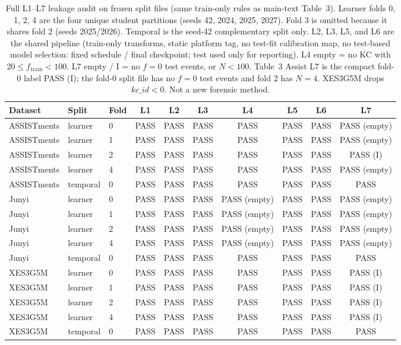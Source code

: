 \begin{table}[htbp]
\caption{Full L1--L7 leakage audit on frozen split files (same train-only rules as main-text Table~3). Learner folds 0, 1, 2, 4 are the four unique student partitions (seeds 42, 2024, 2025, 2027). Fold 3 is omitted because it shares fold 2 (seeds 2025/2026). Temporal is the seed-42 complementary split only. L2, L3, L5, and L6 are the shared pipeline (train-only transforms, static platform tag, no test-fit calibration map, no test-based model selection: fixed schedule / final checkpoint; test used only for reporting). L4 empty = no KC with $20\le f_{\mathrm{train}}<100$. L7 empty / I = no $f=0$ test events, or $N<100$. Table~3 Assist L7 is the compact fold-0 label PASS (I); the fold-0 split file has no $f=0$ test events and fold 2 has $N=4$. XES3G5M drops $kc\_id<0$. Not a new forensic method.}
\label{tab:s10_leakage}
\centering
\scriptsize
\setlength{\tabcolsep}{3.2pt}
\begin{tabular}{lllccccccc}
\toprule
Dataset & Split & Fold & L1 & L2 & L3 & L4 & L5 & L6 & L7 \\
\midrule
ASSISTments & learner & 0 & PASS & PASS & PASS & PASS & PASS & PASS & PASS (empty) \\
ASSISTments & learner & 1 & PASS & PASS & PASS & PASS & PASS & PASS & PASS (empty) \\
ASSISTments & learner & 2 & PASS & PASS & PASS & PASS & PASS & PASS & PASS (I) \\
ASSISTments & learner & 4 & PASS & PASS & PASS & PASS & PASS & PASS & PASS (empty) \\
ASSISTments & temporal & 0 & PASS & PASS & PASS & PASS & PASS & PASS & PASS \\
Junyi & learner & 0 & PASS & PASS & PASS & PASS (empty) & PASS & PASS & PASS (empty) \\
Junyi & learner & 1 & PASS & PASS & PASS & PASS (empty) & PASS & PASS & PASS (empty) \\
Junyi & learner & 2 & PASS & PASS & PASS & PASS (empty) & PASS & PASS & PASS (empty) \\
Junyi & learner & 4 & PASS & PASS & PASS & PASS (empty) & PASS & PASS & PASS (empty) \\
Junyi & temporal & 0 & PASS & PASS & PASS & PASS & PASS & PASS & PASS \\
XES3G5M & learner & 0 & PASS & PASS & PASS & PASS & PASS & PASS & PASS (I) \\
XES3G5M & learner & 1 & PASS & PASS & PASS & PASS & PASS & PASS & PASS (I) \\
XES3G5M & learner & 2 & PASS & PASS & PASS & PASS & PASS & PASS & PASS (I) \\
XES3G5M & learner & 4 & PASS & PASS & PASS & PASS & PASS & PASS & PASS (I) \\
XES3G5M & temporal & 0 & PASS & PASS & PASS & PASS & PASS & PASS & PASS \\
\bottomrule
\end{tabular}
\end{table}
